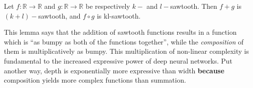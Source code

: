 \documentclass{article}
\begin{document}
\begin{lemma}
Let $f: \mathbb{R} \to \mathbb{R}$ and $g: \mathbb{R} \to \mathbb{R}$ be respectively $k-$ and $l-$sawtooth. Then $f + g$ is $(k + l)-$sawtooth, and $f \circ g$ is kl-sawtooth.
\end{lemma}

This lemma says that the addition of sawtooth functions results in a function which is ``as bumpy as both of the functions together'', while the \textit{composition} of them is multiplicatively as bumpy. This multiplication of non-linear complexity is fundamental to the increased expressive power of deep neural networks. Put another way, depth is exponentially more expressive than width \textbf{because} composition yields more complex functions than summation.










\end{document}

